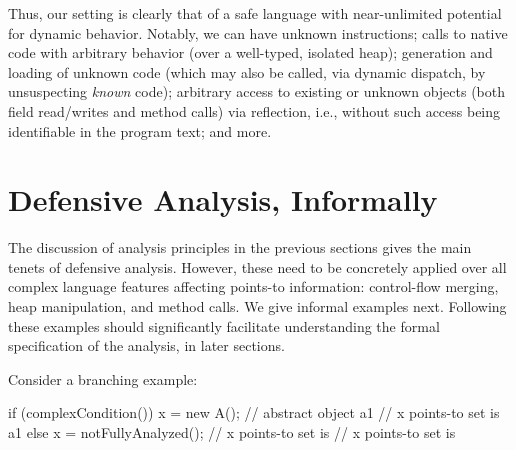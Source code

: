 Thus, our setting is clearly that of a safe language with near-unlimited
potential for dynamic behavior. Notably, we can have unknown
instructions; calls to native code with arbitrary behavior (over a
well-typed, isolated heap); generation and loading of unknown code
(which may also be called, via dynamic dispatch, by unsuspecting
\emph{known} code); arbitrary access to existing or unknown objects
(both field read/writes and method calls) via reflection, i.e.,
without such access being identifiable in the program text; and
more.


\section{Defensive Analysis, Informally}
\label{sec:analysis-informally}

The discussion of analysis principles in the previous sections gives
the main tenets of defensive analysis. However, these need to be
concretely applied over all complex language features affecting
points-to information: control-flow merging, heap manipulation, and
method calls. We give informal examples next. Following these
examples should significantly facilitate understanding the formal
specification of the analysis, in later sections.



Consider a branching example:

\vspace{-3mm}\begin{minipage}[l]{5.1in}
\begin{javacode}
if (complexCondition()) {
  x = new A();  // abstract object a1
   // x points-to set is {a1}
} else {
  x = notFullyAnalyzed();
   // x points-to set is {} 
} // x points-to set is {} 
\end{javacode}
\end{minipage}


